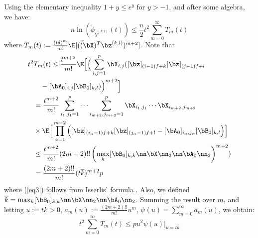 \begin{IEEEproof}
Using the elementary inequality $1+y \leq e^{y}$ for $y>-1$, and after some algebra, we have:
\begin{equation} \label{eq_temp}
	n\ln(\tilde{\phi}_{\tilde{Y}^{(k,l)}}(t)) \leq \frac{n}{2} t^2 \sum_{m=0}^\infty{T_m(t)}
\end{equation}
where $T_m(t):=\frac{(t\delta)^m}{m!} \E[(\vec(\bX)^T \bz^{(k,l)})^{m+2}]$. Note that
\begin{align}
	t^2 &T_m(t) \leq \frac{t^{m+2}}{m!} \E\Big[\Big(\sum_{i,j=1}^p \bX_{i,j} ([\bz]_{(i-1)f+k}[\bz]_{(j-1)f+l} \nonumber \\
		&\quad -[\bA_0]_{i,j}[\bB_0]_{k,l})\Big)^{m+2}\Big] \nonumber \\
		&=\frac{t^{m+2}}{m!} \sum_{i_1,j_1=1}^p \cdots \sum_{i_{m+2},j_{m+2}=1}^p \bX_{i_1,j_1} \cdots \bX_{i_{m+2},j_{m+2}} \nonumber \\
		& \times \E\Big[ \prod_{\alpha=1}^{m+2} \Big( [\bz]_{(i_\alpha-1)f+k}[\bz]_{(j_\alpha-1)f+l} -[\bA_0]_{i_\alpha,j_\alpha}[\bB_0]_{k,l} \Big) \Big] \nonumber \\
		&\leq \frac{t^{m+2}}{m!} (2m+2)!! \left( \max_k [\bB_0]_{k,k} \nn\bX\nn_2 \nn\bA_0\nn_2 \right)^{m+2}) \label{eq3} \\
		&= \frac{(2m+2)!!}{m!} (t \overline{k})^{m+2} p
\end{align}
where (\ref{eq3}) follows from Isserlis' formula \cite{TsiligkaridisTSP}. Also, we defined $\overline{k}=\max_k [\bB_0]_{k,k} \nn \bX\nn_2 \nn\bA_0\nn_2$. Summing the result over $m$, and letting $u:=t \overline{k}>0$, $a_m(u):= \frac{(2m+2)!!}{m!} u^m$, $\psi(u)=\sum_{m=0}^\infty a_m(u)$,  we obtain:
\begin{equation} \label{sum_bound}
	t^2 \sum_{m=0}^\infty{T_m(t)} \leq p u^2 \psi(u) \Big|_{u=t \overline{k}}
\end{equation}

\end{IEEEproof}
